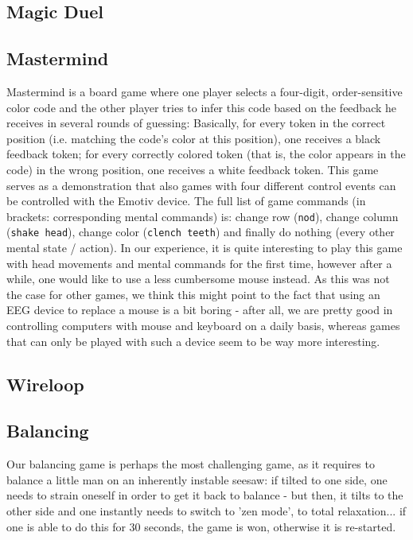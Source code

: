 \documentclass{utue} %
\begin{document}
\subsection{Magic Duel}
\subsection{Mastermind}
Mastermind is a board game where one player selects a four-digit, order-sensitive color code and the other player tries to infer this code based on the feedback he receives in several rounds of guessing: Basically, for every token in the correct position (i.e. matching the code's color at this position), one receives a black feedback token; for every correctly colored token (that is, the color appears in the code) in the wrong position, one receives a white feedback token. This game serves as a demonstration that also games with four different control events can be controlled with the Emotiv device. The full list of game commands (in brackets: corresponding mental commands) is: change row (\texttt{nod}), change column (\texttt{shake head}), change color (\texttt{clench teeth}) and finally do nothing (every other mental state / action). In our experience, it is quite interesting to play this game with head movements and mental commands for the first time, however after a while, one would like to use a less cumbersome mouse instead. As this was not the case for other games, we think this might point to the fact that using an EEG device to replace a mouse is a bit boring - after all, we are pretty good in controlling computers with mouse and keyboard on a daily basis, whereas games that can only be played with such a device seem to be way more interesting.


\subsection{Wireloop}
\subsection{Balancing}
Our balancing game is perhaps the most challenging game, as it requires to balance a little man on an inherently instable seesaw: if tilted to one side, one needs to strain oneself in order to get it back to balance - but then, it tilts to the other side and one instantly needs to switch to 'zen mode', to total relaxation... if one is able to do this for 30 seconds, the game is won, otherwise it is re-started.
\end{document}
